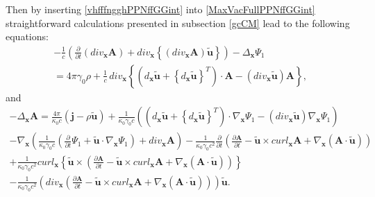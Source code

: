 \documentclass{article}
\theoremstyle{definition}
\theoremstyle{remark}
\renewcommand{\vec}[1]{\mathbf{#1}}
\newcommand{\er}{\eqref}
\newcommand{\er}{\eqref}
\begin{document}
%
Then by inserting \er{vhfffngghPPNffGGint} into
\er{MaxVacFullPPNffGGint} straightforward calculations presented in
subsection \ref{gcCM} lead to the following equations:
\begin{multline}\label{MaxVacFullPPNmmmffffffhhtygghGGint}
-\frac{1}{c}\left(\frac{\partial}{\partial t}\left(div_{\vec x}\vec
A\right)+div_{\vec x} \left\{\left(div_{\vec x}\vec A\right)\vec
{\tilde u}\right\}\right)-\Delta_{\vec
x}\Psi_1\\=4\pi\gamma_0\rho+\frac{1}{c}\,div_{\vec x}
\left\{\left(d_{\vec x}\vec {\tilde u}+\left\{d_{\vec x}\vec {\tilde
u}\right\}^T\right)\cdot\vec A-\left(div_{\vec x}\vec {\tilde
u}\right)\vec A\right\},
\end{multline}
and
\begin{multline}\label{MaxVacFullPPNnnnffffffyuughjhjhjhhjjkjhkkjhhjhghGGint}
-\Delta_{\vec x}\vec A= \frac{4\pi}{\kappa_0 c}\left(\vec j-\rho\vec
{\tilde u}\right)+\frac{1}{\kappa_0\gamma_0 c}\left(\left(d_{\vec
x}\vec {\tilde u}+\left\{d_{\vec x}\vec {\tilde
u}\right\}^T\right)\cdot \nabla_{\vec x}\Psi_1-\left(div_{\vec
x}\vec {\tilde u}\right)\nabla_{\vec x}\Psi_1\right)\\-\nabla_{\vec
x}\left(\frac{1}{\kappa_0\gamma_0 c}\left(\frac{\partial}{\partial
t}\Psi_1+\vec {\tilde u}\cdot\nabla_{\vec x}\Psi_1\right)+div_{\vec
x} \vec A\right)-\frac{1}{\kappa_0\gamma_0
c^2}\frac{\partial}{\partial t}\left(\frac{\partial\vec A}{\partial
t}-\vec {\tilde u}\times curl_{\vec x}\vec A+\nabla_{\vec
x}\left(\vec A\cdot\vec {\tilde
u}\right)\right)\\+\frac{1}{\kappa_0\gamma_0 c^2}curl_{\vec x}
\left\{\vec {\tilde u}\times
\left(\frac{\partial\vec A}{\partial t}-\vec {\tilde u}\times
curl_{\vec x}\vec A+\nabla_{\vec x}\left(\vec A\cdot\vec {\tilde
u}\right)\right)\right\}\\-\frac{1}{\kappa_0\gamma_0
c^2}\left(div_{\vec x}\left(\frac{\partial\vec A}{\partial t}-\vec
{\tilde u}\times curl_{\vec x}\vec A+\nabla_{\vec x}\left(\vec
A\cdot\vec {\tilde u}\right)\right)\right)\vec {\tilde u}.
\end{multline}
\end{document}
